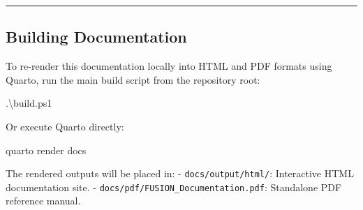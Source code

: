 \documentclass[
]{article}
\newenvironment{Shaded}{\begin{snugshade}}{\end{snugshade}}
\newcommand{\ExtensionTok}[1]{\textcolor[rgb]{0.00,0.23,0.31}{#1}}
\newcommand{\FunctionTok}[1]{\textcolor[rgb]{0.28,0.35,0.67}{#1}}
\newcommand{\NormalTok}[1]{\textcolor[rgb]{0.00,0.23,0.31}{#1}}
\newcommand{\OperatorTok}[1]{\textcolor[rgb]{0.37,0.37,0.37}{#1}}
\begin{document}
\begin{center}\rule{0.5\linewidth}{0.5pt}\end{center}

\subsection{Building Documentation}\label{building-documentation}

To re-render this documentation locally into HTML and PDF formats using
Quarto, run the main build script from the repository root:

\begin{Shaded}
\begin{Highlighting}[]
\OperatorTok{.}\NormalTok{\textbackslash{}build}\OperatorTok{.}\FunctionTok{ps1}
\end{Highlighting}
\end{Shaded}

Or execute Quarto directly:

\begin{Shaded}
\begin{Highlighting}[]
\ExtensionTok{quarto}\NormalTok{ render docs}
\end{Highlighting}
\end{Shaded}

The rendered outputs will be placed in: - \texttt{docs/output/html/}:
Interactive HTML documentation site. -
\texttt{docs/pdf/FUSION\_Documentation.pdf}: Standalone PDF reference
manual.
\end{document}

